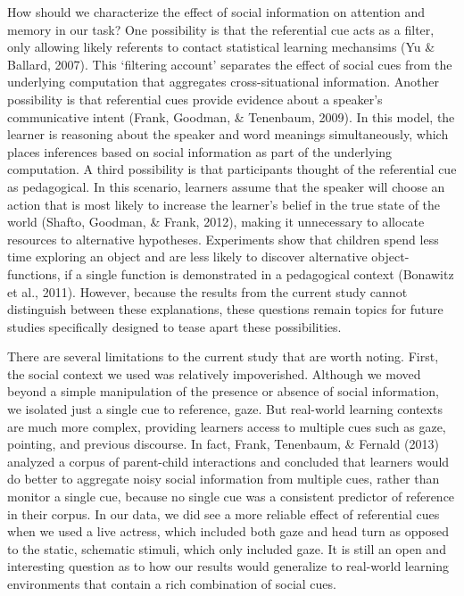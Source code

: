 \documentclass[a4paper,man,natbib]{apa6}
\begin{document}
How should we characterize the effect of social information on attention
and memory in our task? One possibility is that the referential cue acts
as a filter, only allowing likely referents to contact statistical
learning mechansims (Yu \& Ballard, 2007). This `filtering account'
separates the effect of social cues from the underlying computation that
aggregates cross-situational information. Another possibility is that
referential cues provide evidence about a speaker's communicative intent
(Frank, Goodman, \& Tenenbaum, 2009). In this model, the learner is
reasoning about the speaker and word meanings simultaneously, which
places inferences based on social information as part of the underlying
computation. A third possibility is that participants thought of the
referential cue as pedagogical. In this scenario, learners assume that
the speaker will choose an action that is most likely to increase the
learner's belief in the true state of the world (Shafto, Goodman, \&
Frank, 2012), making it unnecessary to allocate resources to alternative
hypotheses. Experiments show that children spend less time exploring an
object and are less likely to discover alternative object-functions, if
a single function is demonstrated in a pedagogical context (Bonawitz et
al., 2011). However, because the results from the current study cannot
distinguish between these explanations, these questions remain topics
for future studies specifically designed to tease apart these
possibilities.

There are several limitations to the current study that are worth
noting. First, the social context we used was relatively impoverished.
Although we moved beyond a simple manipulation of the presence or
absence of social information, we isolated just a single cue to
reference, gaze. But real-world learning contexts are much more complex,
providing learners access to multiple cues such as gaze, pointing, and
previous discourse. In fact, Frank, Tenenbaum, \& Fernald (2013)
analyzed a corpus of parent-child interactions and concluded that
learners would do better to aggregate noisy social information from
multiple cues, rather than monitor a single cue, because no single cue
was a consistent predictor of reference in their corpus. In our data, we
did see a more reliable effect of referential cues when we used a live
actress, which included both gaze and head turn as opposed to the
static, schematic stimuli, which only included gaze. It is still an open
and interesting question as to how our results would generalize to
real-world learning environments that contain a rich combination of
social cues.
\end{document}
